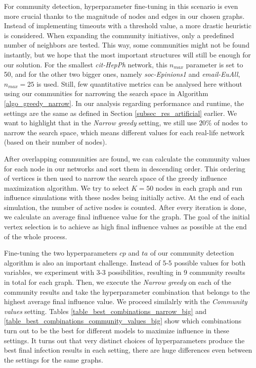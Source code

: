 \documentclass[pdflatex,sn-mathphys-ay]{sn-jnl}
\begin{document}
For community detection, hyperparameter fine-tuning in this scenario is even more crucial thanks to the magnitude of nodes and edges in our chosen graphs. Instead of implementing timeouts with a threshold value, a more drastic heuristic is considered. When expanding the community initiatives, only a predefined number of neighbors are tested. This way, some communities might not be found instantly, but we hope that the most important structures will still be enough for our solution. For the smallest \textit{cit-HepPh} network, this $n_{max}$ parameter is set to 50, and for the other two bigger ones, namely \textit{soc-Epinions1} and \textit{email-EuAll}, $n_{max} = 25$ is used. Still, few quantitative metrics can be analysed here without using our communities for narrowing the search space in Algorithm \ref{algo_greedy_narrow}. In our analysis regarding performance and runtime, the settings are the same as defined in Section \ref{subsec_res_artificial} earlier. We want to highlight that in the \textit{Narrow greedy} setting, we still use $20\%$ of nodes to narrow the search space, which means different values for each real-life network (based on their number of nodes).

After overlapping communities are found, we can calculate the community values for each node in our networks and sort them in descending order. This ordering of vertices is then used to narrow the search space of the greedy influence maximization algorithm. We try to select $K = 50$ nodes in each graph and run influence simulations with these nodes being initially active. At the end of each simulation, the number of active nodes is counted. After every iteration is done, we calculate an average final influence value for the graph. The goal of the initial vertex selection is to achieve as high final influence values as possible at the end of the whole process.

Fine-tuning the two hyperparameters $cp$ and $ta$ of our community detection algorithm is also an important challenge. Instead of 5-5 possible values for both variables, we experiment with 3-3 possibilities, resulting in 9 community results in total for each graph. Then, we execute the \textit{Narrow greedy} on each of the community results and take the hyperparameter combination that belongs to the highest average final influence value. We proceed similalrly with the \textit{Community values} setting. Tables \ref{table_best_combinations_narrow_big} and \ref{table_best_combinations_community_values_big} show which combinations turn out to be the best for different models to maximize influence in these settings. It turns out that very distinct choices of hyperparameters produce the best final infection results in each setting, there are huge differences even between the settings for the same graphs.
\end{document}
